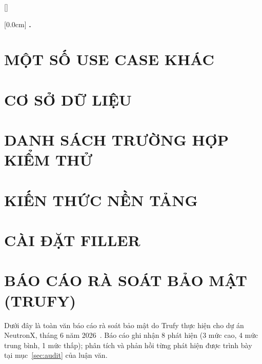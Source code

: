 \documentclass[a4paper,13pt,3p,twoside]{report}
\renewcommand{\bibname}{Danh_sach_tai_lieu_tham_khao}
\theoremstyle{definition}
\begin{document}

\newpage
\renewcommand\bibname{TÀI LIỆU THAM KHẢO}
\nocite{*}
\printbibliography
{}

\appendixpage
\appendices
\addappheadtotoc


{}[]
\titlespacing*{\chapter}{0pt}{-20pt}{20pt}

    [0.0cm]             %
    {\bfseries\vspace{0.3cm}}                  %
    {{\bfseries{\scshape} \thecontentslabel.\ }} %
    {}         %
    {\contentspage}         %
\chapter{MỘT SỐ USE CASE KHÁC}

\newpage
\chapter{CƠ SỞ DỮ LIỆU}

\newpage
\chapter{DANH SÁCH TRƯỜNG HỢP KIỂM THỬ}\label{apdx:testcases}

\newpage
\chapter{KIẾN THỨC NỀN TẢNG}

\newpage
\chapter{CÀI ĐẶT FILLER}
\label{apdx:filler}

\newpage
\chapter{BÁO CÁO RÀ SOÁT BẢO MẬT (TRUFY)}
\label{apdx:trufy}
Dưới đây là toàn văn báo cáo rà soát bảo mật do Trufy thực hiện cho dự án NeutronX, tháng 6 năm 2026~\cite{trufy2026}. Báo cáo ghi nhận 8 phát hiện (3 mức cao, 4 mức trung bình, 1 mức thấp); phân tích và phản hồi từng phát hiện được trình bày tại mục~\ref{sec:audit} của luận văn.

\end{document}
